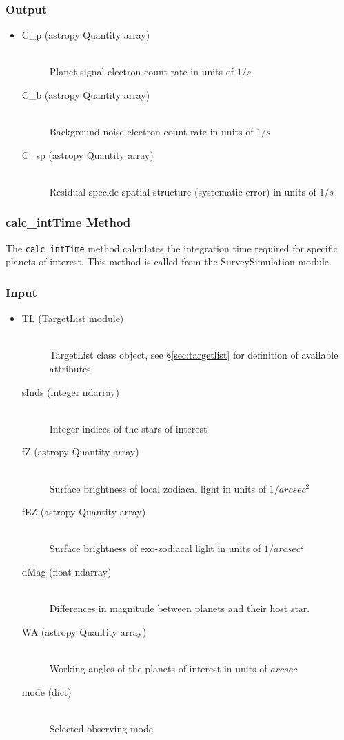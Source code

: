 \documentclass[cleanfoot]{asme2ej}
\begin{document}
\subsubsection*{Output}
\begin{itemize}
\item 
\begin{description}
    \item[C\_p (astropy Quantity array)] \hfill \\ Planet signal electron count rate in units of $ 1/s $
    \item[C\_b (astropy Quantity array)] \hfill \\ Background noise electron count rate in units of $ 1/s $
    \item[C\_sp (astropy Quantity array)] \hfill \\ Residual speckle spatial structure (systematic error) in units of $ 1/s $
\end{description}
\end{itemize}

\subsubsection{calc\_intTime Method} \label{sec:calcintTimetask}
The \verb+calc_intTime+ method calculates the integration time required for specific planets of interest.  This method is called from the SurveySimulation module.
\subsubsection*{Input}
\begin{itemize}
\item 
\begin{description}
    \item[TL (TargetList module)] \hfill \\ TargetList class object, see \S\ref{sec:targetlist} for definition of available attributes
    \item[sInds (integer ndarray)] \hfill \\ Integer indices of the stars of interest
    \item[fZ (astropy Quantity array)] \hfill \\ Surface brightness of local zodiacal light in units of $ 1/arcsec^2 $
    \item[fEZ (astropy Quantity array)] \hfill \\ Surface brightness of exo-zodiacal light in units of $ 1/arcsec^2 $
    \item[dMag (float ndarray)] \hfill \\ Differences in magnitude between planets and their host star.
    \item[WA (astropy Quantity array)] \hfill \\ Working angles of the planets of interest in units of $ arcsec $
    \item[mode (dict)] \hfill \\ Selected observing mode
\end{description}
\end{itemize}
\end{document}
